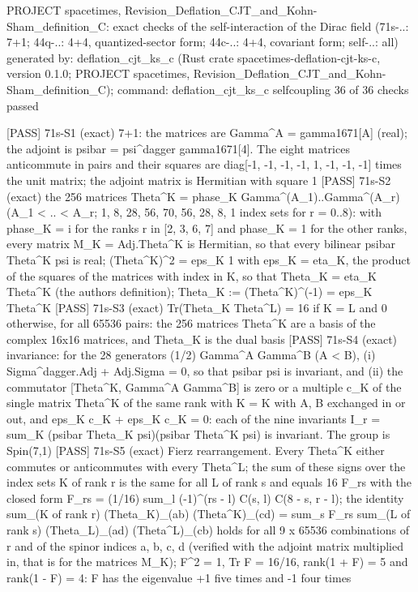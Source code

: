 \documentclass[
  10pt,
]{article}
\newenvironment{Shaded}{}{}
\newcommand{\NormalTok}[1]{#1}
\begin{document}
\begin{Shaded}
\begin{Highlighting}[]
\NormalTok{PROJECT spacetimes, Revision\_Deflation\_CJT\_and\_Kohn{-}Sham\_definition\_C: exact checks of the self{-}interaction of the Dirac field (71s{-}..: 7+1; 44q{-}..: 4+4, quantized{-}sector form; 44c{-}..: 4+4, covariant form; self{-}..: all)}
\NormalTok{generated by: deflation\_cjt\_ks\_c (Rust crate spacetimes{-}deflation{-}cjt{-}ks{-}c, version 0.1.0; PROJECT spacetimes, Revision\_Deflation\_CJT\_and\_Kohn{-}Sham\_definition\_C); command: deflation\_cjt\_ks\_c selfcoupling}
\NormalTok{36 of 36 checks passed}

\NormalTok{[PASS] 71s{-}S1  (exact) 7+1: the matrices are Gamma\^{}A = gamma1671[A] (real); the adjoint is psibar = psi\^{}dagger gamma1671[4]. The eight matrices anticommute in pairs and their squares are diag[{-}1, {-}1, {-}1, {-}1, 1, {-}1, {-}1, {-}1] times the unit matrix; the adjoint matrix is Hermitian with square 1}
\NormalTok{[PASS] 71s{-}S2  (exact) the 256 matrices Theta\^{}K = phase\_K Gamma\^{}(A\_1)..Gamma\^{}(A\_r) (A\_1 \textless{} .. \textless{} A\_r; 1, 8, 28, 56, 70, 56, 28, 8, 1 index sets for r = 0..8): with phase\_K = i for the ranks r in [2, 3, 6, 7] and phase\_K = 1 for the other ranks, every matrix M\_K = Adj.Theta\^{}K is Hermitian, so that every bilinear psibar Theta\^{}K psi is real; (Theta\^{}K)\^{}2 = eps\_K 1 with eps\_K = eta\_K, the product of the squares of the matrices with index in K, so that Theta\_K = eta\_K Theta\^{}K (the author\textquotesingle{}s definition); Theta\_K := (Theta\^{}K)\^{}({-}1) = eps\_K Theta\^{}K}
\NormalTok{[PASS] 71s{-}S3  (exact) Tr(Theta\_K Theta\^{}L) = 16 if K = L and 0 otherwise, for all 65536 pairs: the 256 matrices Theta\^{}K are a basis of the complex 16x16 matrices, and Theta\_K is the dual basis}
\NormalTok{[PASS] 71s{-}S4  (exact) invariance: for the 28 generators (1/2) Gamma\^{}A Gamma\^{}B (A \textless{} B), (i) Sigma\^{}dagger.Adj + Adj.Sigma = 0, so that psibar psi is invariant, and (ii) the commutator [Theta\^{}K, Gamma\^{}A Gamma\^{}B] is zero or a multiple c\_K of the single matrix Theta\^{}K\textquotesingle{} of the same rank with K\textquotesingle{} = K with A, B exchanged in or out, and eps\_K c\_K + eps\_K\textquotesingle{} c\_K\textquotesingle{} = 0: each of the nine invariants I\_r = sum\_K (psibar Theta\_K psi)(psibar Theta\^{}K psi) is invariant. The group is Spin(7,1)}
\NormalTok{[PASS] 71s{-}S5  (exact) Fierz rearrangement. Every Theta\^{}K either commutes or anticommutes with every Theta\^{}L; the sum of these signs over the index sets K of rank r is the same for all L of rank s and equals 16 F\_rs with the closed form F\_rs = (1/16) sum\_l ({-}1)\^{}(rs {-} l) C(s, l) C(8 {-} s, r {-} l); the identity sum\_(K of rank r) (Theta\_K)\_(ab) (Theta\^{}K)\_(cd) = sum\_s F\_rs sum\_(L of rank s) (Theta\_L)\_(ad) (Theta\^{}L)\_(cb) holds for all 9 x 65536 combinations of r and of the spinor indices a, b, c, d (verified with the adjoint matrix multiplied in, that is for the matrices M\_K); F\^{}2 = 1, Tr F = 16/16, rank(1 + F) = 5 and rank(1 {-} F) = 4: F has the eigenvalue +1 five times and {-}1 four times}

\end{Highlighting}
\end{Shaded}
\end{document}
